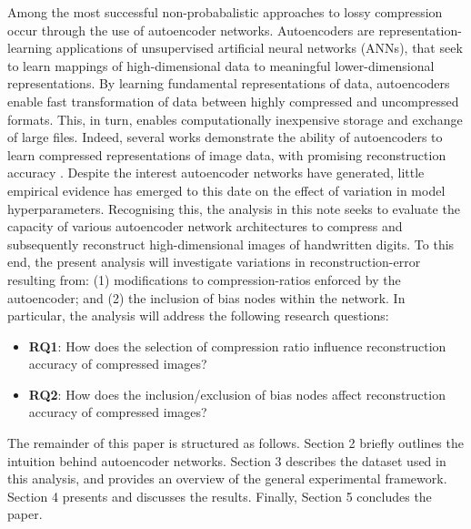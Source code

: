 Among the most successful non-probabalistic approaches to lossy compression occur through the use of autoencoder networks.
Autoencoders are representation-learning applications of unsupervised artificial neural networks (ANNs), that seek to learn mappings of high-dimensional data to meaningful lower-dimensional representations.
By learning fundamental representations of data, autoencoders enable fast transformation of data between highly compressed and uncompressed formats.
This, in turn, enables computationally inexpensive storage and exchange of large files.
Indeed, several works demonstrate the ability of autoencoders to learn compressed representations of image data, with promising reconstruction accuracy \cite{cheng2018deep, toderici2017full, balle2016end}.
Despite the interest autoencoder networks have generated, little empirical evidence has emerged to this date on the effect of variation in model hyperparameters.
Recognising this, the analysis in this note seeks to evaluate the capacity of various autoencoder network architectures to compress and subsequently reconstruct high-dimensional images of handwritten digits. 
To this end, the present analysis will investigate variations in reconstruction-error resulting from: (1) modifications to compression-ratios enforced by the autoencoder; and (2) the inclusion of bias nodes within the network. In particular, the analysis will address the following research questions:

\begin{itemize}
	\item[] \textbf{RQ1}: How does the selection of compression ratio influence reconstruction accuracy of compressed images?
	\item[] \textbf{RQ2}: How does the inclusion/exclusion of bias nodes affect reconstruction accuracy of compressed images?
\end{itemize}

\noindent
The remainder of this paper is structured as follows. 
Section 2 briefly outlines the intuition behind autoencoder networks.
Section 3 describes the dataset used in this analysis, and provides an overview of the general experimental framework.
Section 4 presents and discusses the results. 
Finally, Section 5 concludes the paper.



